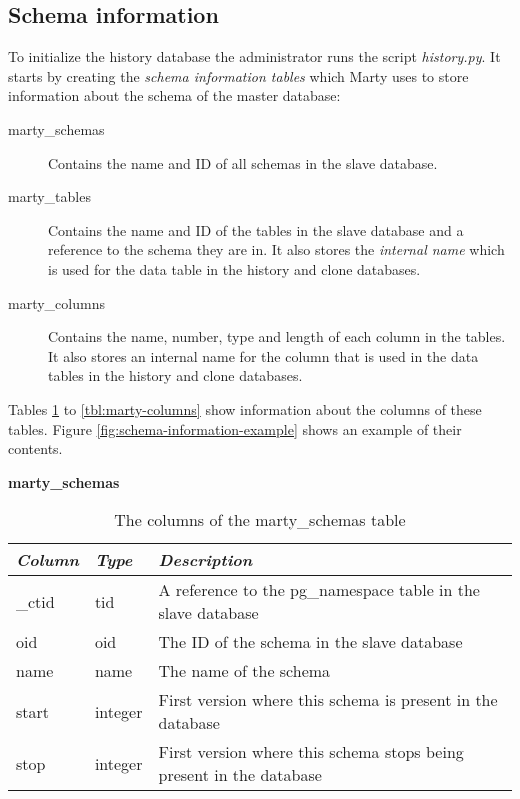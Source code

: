 \subsection{Schema information}
To initialize the history database the administrator runs the script \textit{history.py}.
It starts by creating the \textit{schema information tables} which Marty uses to store information about the schema of the master database:

\begin{description}
  \item[marty\_schemas]
    Contains the name and ID of all schemas in the slave database.
  \item[marty\_tables]
    Contains the name and ID of the tables in the slave database and a reference to the schema they are in.
    It also stores the \textit{internal name} which is used for the data table in the history and clone databases.
  \item[marty\_columns]
    Contains the name, number, type and length of each column in the tables.
    It also stores an internal name for the column that is used in the data tables in the history and clone databases.
\end{description}

Tables \ref{tbl:marty-schemas} to \ref{tbl:marty-columns} show information about the columns of these tables.
Figure \ref{fig:schema-information-example} shows an example of their contents.

\begin{table}[h]
  \centering
  \textbf{marty\_schemas}
  \begin{tabularx}{\textwidth}{llX}
    \textit{Column} & \textit{Type} & \textit{Description} \\
    \midrule
    \_ctid & tid & A reference to the pg\_namespace table in the slave database \\
    oid & oid & The ID of the schema in the slave database \\
    name & name & The name of the schema \\
    start & integer & First version where this schema is present in the database \\
    stop & integer & First version where this schema stops being present in the database \\
  \end{tabularx}
  \caption{The columns of the marty\_schemas table}
  \label{tbl:marty-schemas}
\end{table}


